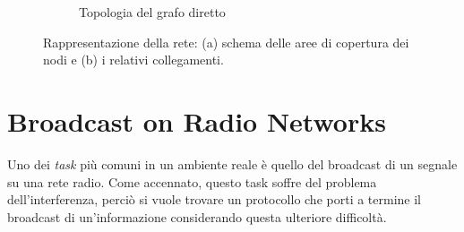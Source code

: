 \begin{figure}[htbp]
\begin{subfigure}[b]{0.45\textwidth}
{
        }
        \caption{Topologia del grafo diretto}
        \label{fig:grafo}
    \end{subfigure}
    
    \caption{Rappresentazione della rete: (a) schema delle aree di copertura dei nodi e (b) i relativi collegamenti.}
    \label{fig:rete_completa}
\end{figure}

\newpage
\section{Broadcast on Radio Networks}

Uno dei \textit{task} più comuni in un ambiente reale è quello del broadcast di un segnale su una rete radio. Come accennato, questo task soffre del problema dell'interferenza, perciò si vuole trovare un protocollo che porti a termine il broadcast di un'informazione considerando questa ulteriore difficoltà.

